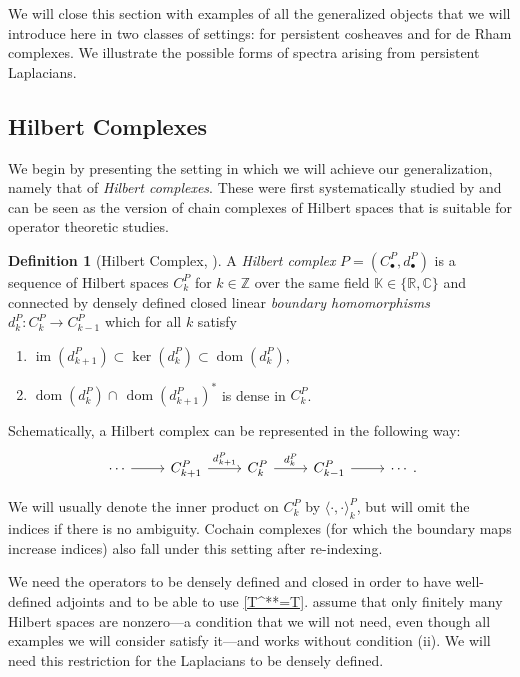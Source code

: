 \documentclass[11pt]{article}
\theoremstyle{definition}
\newtheorem{definition}[theorem]{Definition}
\theoremstyle{remark}
\DeclareMathOperator\dom{dom}
\DeclareMathOperator{\im}{im}
\newcommand{\IZ}{\mathbb{Z}}
\begin{document}
We will close this section with examples of all the generalized objects that we will introduce here in two classes of settings: for persistent cosheaves and for de Rham complexes.  We illustrate the possible forms of spectra arising from persistent Laplacians.

\subsection{Hilbert Complexes}

We begin by presenting the setting in which we will achieve our generalization, namely that of \emph{Hilbert complexes}. These were first systematically studied by \citet{Hilbert} and can be seen as the version of chain complexes of Hilbert spaces that is suitable for operator theoretic studies.

\begin{definition}[Hilbert Complex, \citet{Hilbert}] \label{def:cc}
A \textit{Hilbert complex} $P=(C^P_\bullet,d^{P}_{\bullet})$ is a sequence of Hilbert spaces $C^{P}_{k}$ for $k \in \IZ$ over the same field $\mathbb{K} \in \{\mathbb{R},\mathbb{C}\}$
and connected by densely defined closed linear \textit{boundary homomorphisms} $d^{P}_k : C^{P}_{k} \to C^{P}_{k-1}$ which for all $k$ satisfy 
\begin{enumerate}
    \item[(i)] $\im \! \left(d_{k+1}^P\right) \subset \ker\! \left(d_k^P \right) \subset \dom\! \left(d_k^P \right)$,
    \item[(ii)] $\dom\! \left(d_k^P \right) \cap \, \dom\! \left(d_{k+1}^P \right) ^*$ is dense in $C_k^P$.
\end{enumerate}

\end{definition}

Schematically, a Hilbert complex can be represented in the following way:
\[
\begin{tikzcd}
\cdots \arrow[r] & C^{P}_{k+1}  \arrow[r, "d^{P}_{k+1}"] & C^{P}_{k} \arrow[r, "d^{P}_{k}"] & C^{P}_{k-1} \arrow[r] & \cdots
\end{tikzcd}.
\]

We will usually denote the inner product on $C^P_k$ by $\langle \cdot ,\cdot \rangle^P_k$, but will omit the indices if there is no ambiguity. Cochain complexes (for which the boundary maps increase indices) also fall under this setting after re-indexing.

We need the operators to be densely defined and closed in order to have well-defined adjoints and to be able to use \cref{T^**=T}. \citet{Hilbert} assume that only finitely many Hilbert spaces are nonzero---a condition that we will not need, even though all examples we will consider satisfy it---and works without condition (ii). We will need this restriction for the Laplacians to be densely defined.
\end{document}
